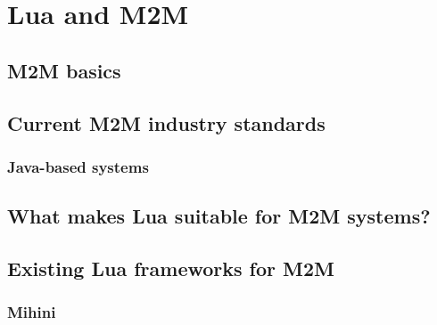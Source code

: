 \chapter{Lua and M2M}
\label{ch:lua_m2m}

\section{M2M basics}
\label{sec:m2m_basics}

\section{Current M2M industry standards}
\label{sec:m2m_industry_standards}

\subsection{Java-based systems}

\section{What makes Lua suitable for M2M systems?}

\section{Existing Lua frameworks for M2M}
\label{sec:existing_frameworks}

\subsection{Mihini}